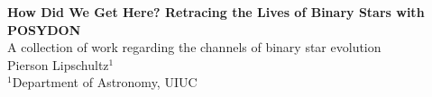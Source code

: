 \documentclass{article}
\begin{document}
\begin{tcolorbox}[
    enhanced,
    colback  = PosterBlue,
    colframe = PosterBlue,
    boxrule  = 0pt,
    arc      = 10pt,
    left = 18pt, right = 18pt, top = 18pt, bottom = 18pt,
]
    \begin{minipage}[c]{\linewidth}
        \centering
        {\fontsize{72}{86}\selectfont\bfseries\color{white}
            How Did We Get Here? Retracing the Lives of Binary Stars with POSYDON}\\[10pt]
        {\fontsize{38}{46}\selectfont\color{PosterLightBlue}
            A collection of work regarding the channels of binary star evolution}\\[10pt]
        {\fontsize{30}{36}\selectfont\color{white}
            Pierson Lipschultz$^{1}$}\\[5pt]
        {\fontsize{24}{29}\selectfont\color{PosterLightBlue}
            $^{1}$Department of Astronomy, UIUC}
    \end{minipage}
\end{tcolorbox}

\vspace{0.3in}
\end{document}
